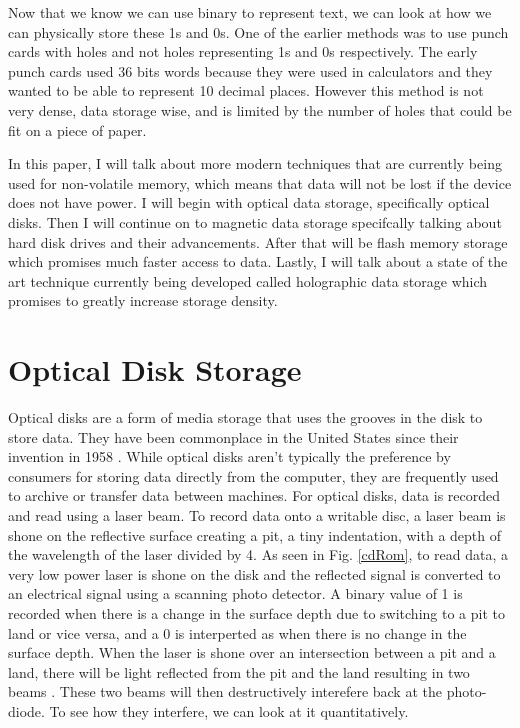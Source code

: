 \documentclass[ notitlepage, numerical, 11pt]{revtex4-1} %
\begin{document}
Now that we know we can use binary to represent text, we can look at how we can physically store these 1s and 0s. One of the earlier methods was to use punch cards with holes and not holes representing 1s and 0s respectively. The early punch cards used 36 bits words because they were used in calculators and they wanted to be able to represent 10 decimal places. However this method is not very dense, data storage wise, and is limited by the number of holes that could be fit on a piece of paper.


In this paper, I will talk about more modern techniques that are currently being used for non-volatile memory, which means that data will not be lost if the device does not have power. I will begin with optical data storage, specifically optical disks. Then I will continue on to magnetic data storage specifcally talking about hard disk drives and their advancements. After that will be flash memory storage which promises much faster access to data. Lastly, I will talk about a state of the art technique currently being developed called holographic data storage which promises to greatly increase storage density.





\section{Optical Disk Storage}

Optical disks are a form of media storage that uses the grooves in the disk to store data. They have been commonplace in the United States since their invention in 1958 \cite{memory}. While optical disks aren't typically the preference by consumers for storing data directly from the computer, they are frequently used to archive or transfer data between machines. For optical disks, data is recorded and read using a laser beam. To record data onto a writable disc, a laser beam is shone on the reflective surface creating a pit, a tiny indentation, with a depth of the wavelength of the laser divided by 4. As seen in Fig. \ref{cdRom}, to read data, a very low power laser is shone on the disk and the reflected signal is converted to an electrical signal using a scanning photo detector. A binary value of 1 is recorded when there is a change in the surface depth due to switching to a pit to land or vice versa, and a 0 is interperted as when there is no change in the surface depth. When the laser is shone over an intersection between a pit and a land, there will be light reflected from the pit and the land resulting in two beams \cite{memory}. These two beams will then destructively interefere back at the photo-diode. To see how they interfere, we can look at it quantitatively. 
\end{document}
